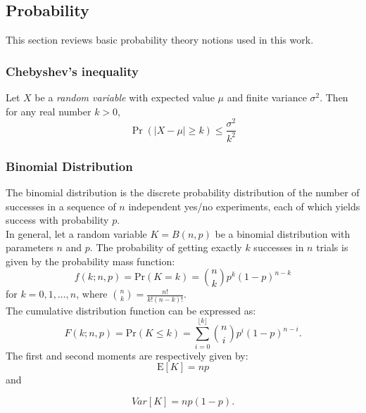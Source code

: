 
\begin{appendices}

\chapter[Appendix]{}

\section{Probability}
This section reviews basic probability theory notions used in this work.
\subsection*{Chebyshev's inequality}
Let $X$ be a \emph{random variable} with expected value $\mu$ and finite variance $\sigma^{2}$. Then for any real number $k>0$,
\begin{equation}
\Pr(\left|X-\mu\right|\geq k)\leq\frac{\sigma^{2}}{k^2}
\label{eq:cheby}
\end{equation}
\subsection*{Binomial Distribution}
The binomial distribution is the discrete probability distribution of the number of successes in a sequence of $n$ independent yes/no experiments, each of which yields success with probability $p$.\\ In general, let a random variable $K=  B(n,p)$ be a binomial distribution with parameters $n$ and $p$. The probability of getting exactly $k$ successes in $n$ trials is given by the probability mass function:
\begin{equation}
f(k;n,p)=\textrm{Pr}(K=k)= {n \choose k} p^{k} (1-p)^{n-k} 
\end{equation}
for $k=0, 1, \ldots, n$, where $\displaystyle{n \choose k}=\frac{n!}{k!(n-k)!}$.\\
The cumulative distribution function can be expressed as:
\begin{equation}
F(k;n,p)=\textrm{Pr}(K\leq k)= \sum_{i=0}^{\lfloor k \rfloor} {n \choose i} p^{i} (1-p)^{n-i}.
\end{equation}
The first and second moments are respectively given by:
\begin{equation}
\textrm{E}[K]=np
\end{equation}
and

\begin{equation}
Var[K]=np(1-p).
\end{equation}



\end{appendices}
